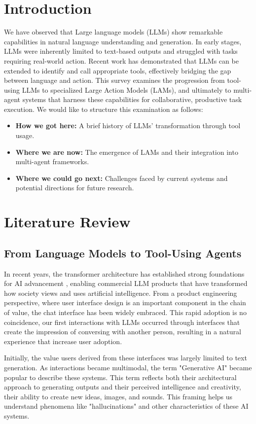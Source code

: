 \documentclass[journal,twoside,10pt]{IEEEtran}
\begin{document}
\section{Introduction}
We have observed that Large language models (LLMs) show remarkable capabilities in natural language understanding and generation. 
In early stages, LLMs were inherently limited to text-based outputs and struggled with tasks requiring real-world action. 
Recent work has demonstrated that LLMs can be extended to identify and call appropriate tools, effectively bridging the gap between language and action. 
This survey examines the progression from tool-using LLMs to specialized Large Action Models (LAMs), and ultimately to multi-agent systems that harness these capabilities for collaborative, productive task execution.
We would like to structure this examination as follows:
\begin{itemize}
    \item \textbf{How we got here:} A brief history of LLMs' transformation through tool usage.
    \item \textbf{Where we are now:} The emergence of LAMs and their integration into multi-agent frameworks.
    \item \textbf{Where we could go next:} Challenges faced by current systems and potential directions for future research.
\end{itemize}

\section{Literature Review}

\subsection{From Language Models to Tool-Using Agents}

In recent years, the transformer architecture has established strong foundations for AI advancement , enabling commercial LLM products that have transformed how society views and uses artificial intelligence. From a product engineering perspective, where user interface design is an important component in the chain of value, the chat interface has been widely embraced. This rapid adoption is no coincidence, our first interactions with LLMs occurred through interfaces that create the impression of conversing with another person, resulting in a natural experience that increase user adoption.

Initially, the value users derived from these interfaces was largely limited to text generation. As interactions became multimodal, the term "Generative AI" became popular to describe these systems. This term reflects both their architectural approach to generating outputs and their perceived intelligence and creativity, their ability to create new ideas, images, and sounds. This framing helps us understand phenomena like "hallucinations" and other characteristics of these AI systems.
\end{document}
